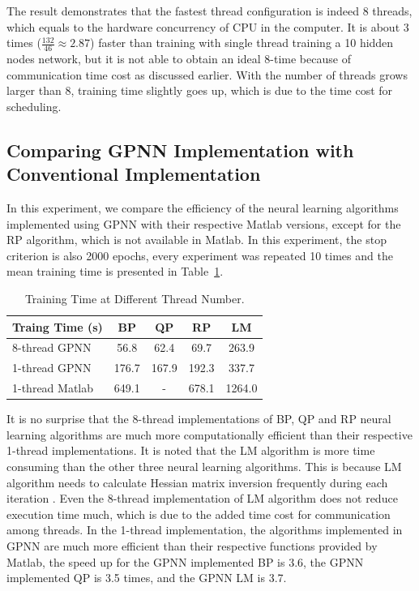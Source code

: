 \documentclass[procedia]{easychair}
\begin{document}
The result demonstrates that the fastest thread configuration is indeed 8 threads, which equals to the hardware concurrency of CPU in the computer.  It is about 3 times ($ \frac{132}{46} \approx 2.87 $) faster than training with single thread training a 10 hidden nodes network, but it is not able to obtain an ideal 8-time because of communication time cost as discussed earlier.  With the number of threads grows larger than 8, training time slightly goes up, which is due to the time cost for scheduling.

\subsection{Comparing GPNN Implementation with Conventional Implementation}

In this experiment, we compare the efficiency of the neural learning algorithms implemented using GPNN with their respective Matlab versions, except for the RP algorithm, which is not available in Matlab.  In this experiment, the stop criterion is also 2000 epochs, every experiment was repeated 10 times and the mean training time is presented in Table~\ref{table:algorithm_complexity}.

\begin{table}[htp]
    \centering
    \caption{Training Time at Different Thread Number.}
    \begin{tabular}{ l c c c c }
        \hline \hline
        Traing Time (s) & BP & QP & RP & LM \\
        \hline
        8-thread GPNN & 56.8 & 62.4 & 69.7 & 263.9 \\
        1-thread GPNN & 176.7 & 167.9 & 192.3 & 337.7 \\
        1-thread Matlab & 649.1 & - & 678.1 & 1264.0 \\
        \hline \hline
    \end{tabular}
    \label{table:algorithm_complexity}
\end{table}

It is no surprise that the 8-thread implementations of BP, QP and RP neural learning algorithms are much more computationally efficient than their respective 1-thread implementations.  It is noted that the LM algorithm is more time consuming than the other three neural learning algorithms.  This is because LM algorithm needs to calculate Hessian matrix inversion frequently during each iteration \cite{yu2011levenberg}.  Even the 8-thread implementation of LM algorithm does not reduce execution time much, which is due to the added time cost for communication among threads.  In the 1-thread implementation, the algorithms implemented in GPNN are much more efficient than their respective functions provided by Matlab, the speed up for the GPNN implemented BP is 3.6, the GPNN implemented QP is 3.5 times, and the GPNN LM is 3.7.
\end{document}
